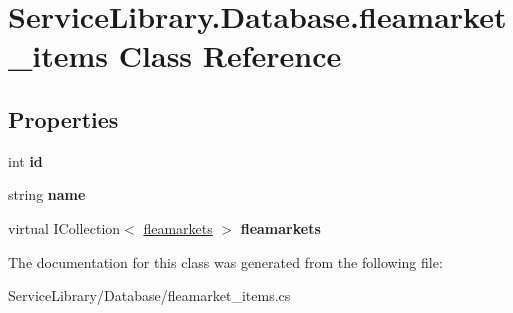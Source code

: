 \hypertarget{class_service_library_1_1_database_1_1fleamarket__items}{\section{Service\-Library.\-Database.\-fleamarket\-\_\-items Class Reference}
\label{class_service_library_1_1_database_1_1fleamarket__items}
}
\subsection*{Properties}
\begin{DoxyCompactItemize}
\item 
\hypertarget{class_service_library_1_1_database_1_1fleamarket__items_ad3e7996326f63391feca9b26e96eec5c}{int {\bfseries id}}\label{class_service_library_1_1_database_1_1fleamarket__items_ad3e7996326f63391feca9b26e96eec5c}

\item 
\hypertarget{class_service_library_1_1_database_1_1fleamarket__items_a248368019fc66df572defd04099b1990}{string {\bfseries name}}\label{class_service_library_1_1_database_1_1fleamarket__items_a248368019fc66df572defd04099b1990}

\item 
\hypertarget{class_service_library_1_1_database_1_1fleamarket__items_a3529ee135423e926c89e355d5d00d592}{virtual I\-Collection$<$ \hyperlink{class_service_library_1_1_database_1_1fleamarkets}{fleamarkets} $>$ {\bfseries fleamarkets}}\label{class_service_library_1_1_database_1_1fleamarket__items_a3529ee135423e926c89e355d5d00d592}

\end{DoxyCompactItemize}


The documentation for this class was generated from the following file\-:\begin{DoxyCompactItemize}
\item 
Service\-Library/\-Database/fleamarket\-\_\-items.\-cs\end{DoxyCompactItemize}
